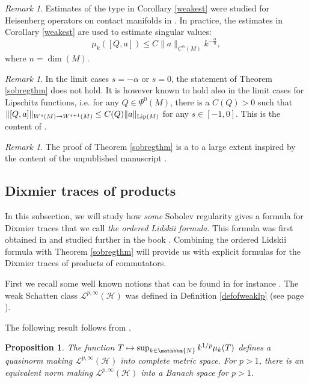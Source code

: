 \documentclass[10pt]{amsart}
\newtheorem{prop}[thm]{Proposition}
\theoremstyle{remark}
\newtheorem{remark}[thm]{Remark}
\theoremstyle{definition}
\begin{document}
\begin{remark}
\label{weakscrem}
Estimates of the type in Corollary \ref{weakest} were studied for Heisenberg operators on contact manifolds in \cite{gimpgoff}. In practice, the estimates in Corollary \eqref{weakest} are used to estimate singular values:
$$\mu_k([Q,a])\leq C\|a\|_{C^\alpha(M)}k^{-\frac{\alpha}{n}},$$
where $n=\dim(M)$. 
\end{remark}

\begin{remark}
In the limit cases $s=-\alpha$ or $s=0$, the statement of Theorem \ref{sobregthm} does not hold. It is however known to hold also in the limit cases for Lipschitz functions, i.e. for any $Q\in \Psi^0(M)$, there is a $C(Q)>0$ such that $\|[Q,a]\|_{W^s(M)\to W^{s+1}(M)}\leq C(Q)\|a\|_{{\textnormal{Lip}}(M)}$ for any $s\in [-1,0]$. This is the content of \cite[Proposition 3.6.B]{nlin}. 
\end{remark}

\begin{remark}
The proof of Theorem \ref{sobregthm} is a to a large extent inspired by the content of the unpublished manuscript \cite{hbcom}. 
\end{remark}

\subsection{Dixmier traces of products}
\label{dixtracesmodsection}

In this subsection, we will study how \emph{some} Sobolev regularity gives a formula for Dixmier traces that we call \emph{the ordered Lidskii formula}. This formula was first obtained in \cite{kaloposu} and studied further in the book \cite{sukolord}. Combining the ordered Lidskii formula with Theorem \ref{sobregthm} will provide us with explicit formulas for the Dixmier traces of products of commutators.

First we recall some well known notions that can be found in for instance \cite{sukolord}. The weak Schatten class $\mathcal{L}^{p,\infty}({\mathcal{H}})$ was defined in Definition \ref{defofweaklp} (see page \pageref{defofweaklp}). 

The following result follows from \cite[Chapter 1.7 and Theorem 2.5]{simon}.

\begin{prop}
\label{equinorm}
The function $T\mapsto \sup_{k\in {\mathbbm{N}}} k^{1/p}\mu_k(T)$ defines a quasinorm making $\mathcal{L}^{p,\infty}({\mathcal{H}})$ into complete metric space. For $p>1$, there is an equivalent norm making $\mathcal{L}^{p,\infty}({\mathcal{H}})$ into a Banach space for $p>1$. 
\end{prop}
\end{document}
